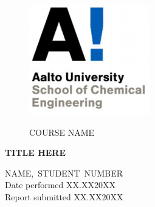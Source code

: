 \documentclass[11pt]{article}
\begin{document}
\begin{titlepage}
\begin{figure}[t]
    \includegraphics[scale=1.2]{photos/School_of_Chemical_Engineering.png} %
    \vspace*{1cm}
    \begin{flushleft}
    {\fontsize{11}{10}\selectfont COURSE NAME} %
    \end{flushleft}
\end{figure}


\vspace*{4cm}

\begin{center}
\fontsize{16}{15}
\textbf{TITLE HERE} %
\end{center}

\vfill
\hfill\begin{minipage}{0.4\linewidth}
{\fontsize{11}{10}\selectfont
NAME, STUDENT NUMBER \\
\newline
Date performed %
\hfill XX.XX20XX\\
Report submitted %
\hfill XX.XX20XX \\
} %
\end{minipage}


\date{}

\end{titlepage}

\end{document}
